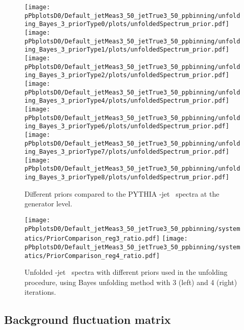 \begin{figure}[bth]
\centering
\texttt{[image: pPbplotsD0/Default\_jetMeas3\_50\_jetTrue3\_50\_ppbinning/unfolding\_Bayes\_3\_priorType0/plots/unfoldedSpectrum\_prior.pdf]}
\texttt{[image: pPbplotsD0/Default\_jetMeas3\_50\_jetTrue3\_50\_ppbinning/unfolding\_Bayes\_3\_priorType1/plots/unfoldedSpectrum\_prior.pdf]}
\texttt{[image: pPbplotsD0/Default\_jetMeas3\_50\_jetTrue3\_50\_ppbinning/unfolding\_Bayes\_3\_priorType2/plots/unfoldedSpectrum\_prior.pdf]}
\texttt{[image: pPbplotsD0/Default\_jetMeas3\_50\_jetTrue3\_50\_ppbinning/unfolding\_Bayes\_3\_priorType4/plots/unfoldedSpectrum\_prior.pdf]}
\texttt{[image: pPbplotsD0/Default\_jetMeas3\_50\_jetTrue3\_50\_ppbinning/unfolding\_Bayes\_3\_priorType6/plots/unfoldedSpectrum\_prior.pdf]}
\texttt{[image: pPbplotsD0/Default\_jetMeas3\_50\_jetTrue3\_50\_ppbinning/unfolding\_Bayes\_3\_priorType7/plots/unfoldedSpectrum\_prior.pdf]}
\texttt{[image: pPbplotsD0/Default\_jetMeas3\_50\_jetTrue3\_50\_ppbinning/unfolding\_Bayes\_3\_priorType8/plots/unfoldedSpectrum\_prior.pdf]}
\caption{Different priors compared to the PYTHIA \Dzero-jet \pt\ spectra at the generator level.}
\label{fig:UnfSpec_pPb_Dzero_priors_all}
\end{figure}

\begin{figure}[bth]
\centering
\texttt{[image: pPbplotsD0/Default\_jetMeas3\_50\_jetTrue3\_50\_ppbinning/systematics/PriorComparison\_reg3\_ratio.pdf]}
\texttt{[image: pPbplotsD0/Default\_jetMeas3\_50\_jetTrue3\_50\_ppbinning/systematics/PriorComparison\_reg4\_ratio.pdf]}
\caption{Unfolded \Dzero-jet \pt\ spectra with different priors used in the unfolding procedure, using Bayes unfolding method with 3 (left) and 4 (right) iterations.}
\label{fig:UnfSpec_pPb_Dzero_priors}
\end{figure}


\subsection{Background fluctuation matrix}
\label{sec:sysUnc_bkgFluctuations}

